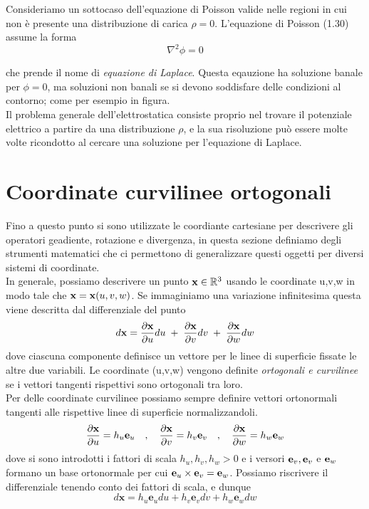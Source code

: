 Consideriamo un sottocaso dell'equazione di Poisson valide nelle regioni in cui non \`e presente una distribuzione di carica $\rho = 0$. L'equazione di Poisson (1.30) assume la forma 
\begin{equation}
	\nabla^2\phi = 0
\end{equation}

che prende il nome di \textit{equazione di Laplace}.
Questa eqauzione ha soluzione banale per $\phi = 0$, ma soluzioni non banali se si devono soddisfare delle condizioni al contorno; come per esempio in figura. 
\\
Il problema generale dell'elettrostatica consiste proprio nel trovare il potenziale elettrico a partire da una distribuzione $ \rho$, e la sua risoluzione pu\`o essere molte volte ricondotto al cercare una soluzione per l'equazione di Laplace.  

\newpage


\section{Coordinate curvilinee ortogonali}

Fino a questo punto si sono utilizzate le coordiante cartesiane per descrivere gli operatori geadiente, rotazione e divergenza, in questa sezione definiamo degli strumenti matematici che ci permettono di generalizzare questi oggetti per diversi sistemi di coordinate. 
\\

In generale, possiamo descrivere un punto $\bold{x} \in \mathbb{R}^3$ usando le coordinate u,v,w in modo tale che $\bold{x} = \bold{x}(u,v,w)$. Se immaginiamo una variazione infinitesima questa viene descritta dal differenziale del punto
\begin{equation*}
	d\bold{x} = \frac{\partial \bold{x}}{\partial u} du \;+\; \frac{\partial \bold{x}}{\partial v}dv \; + \; \frac{\partial \bold{x}}{\partial w}dw
\end{equation*}
dove ciascuna componente definisce un vettore per le linee di superficie fissate le altre due variabili. Le coordinate (u,v,w) vengono definite \textit{ortogonali e curvilinee} se i vettori tangenti rispettivi sono ortogonali tra loro.
\\

Per delle coordinate curvilinee possiamo sempre definire vettori ortonormali tangenti alle rispettive linee di superficie normalizzandoli. 
\begin{equation*}
	\frac{\partial \bold{x}}{\partial u}=h_u \bold{e}_u \quad,\quad \frac{\partial \bold{x}}{\partial v} = h_v \bold{e}_v \quad , \quad \frac{\partial \bold{x}}{\partial w} = h_w \bold{e}_w
\end{equation*}
dove si sono introdotti i fattori di scala $h_u,h_v,h_w >0$ e i versori $\bold{e}_{v},\bold{e}_{v}$ e $\bold{e}_w$ formano un base ortonormale per cui $\bold{e}_{u} \times \bold{e}_{v} = \bold{e}_{w}$. Possiamo riscrivere il differenziale tenendo conto dei fattori di scala, e dunque
\begin{equation}
	d \mathbf{x}=h_u \mathbf{e}_u d u+h_v \mathbf{e}_v d v+h_w \mathbf{e}_w d w
\end{equation}

